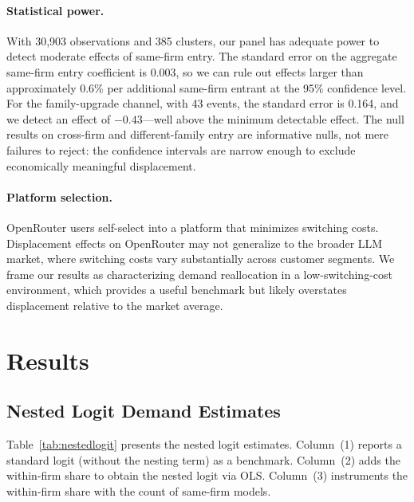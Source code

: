 \documentclass[11pt, a4paper]{article}
\begin{document}
\paragraph{Statistical power.} With 30,903 observations and 385 clusters, our panel has adequate power to detect moderate effects of same-firm entry. The standard error on the aggregate same-firm entry coefficient is 0.003, so we can rule out effects larger than approximately 0.6\% per additional same-firm entrant at the 95\% confidence level. For the family-upgrade channel, with 43 events, the standard error is 0.164, and we detect an effect of $-0.43$---well above the minimum detectable effect. The null results on cross-firm and different-family entry are informative nulls, not mere failures to reject: the confidence intervals are narrow enough to exclude economically meaningful displacement.

\paragraph{Platform selection.} OpenRouter users self-select into a platform that minimizes switching costs. Displacement effects on OpenRouter may not generalize to the broader LLM market, where switching costs vary substantially across customer segments. We frame our results as characterizing demand reallocation in a low-switching-cost environment, which provides a useful benchmark but likely overstates displacement relative to the market average.

\section{Results}
\label{sec:results}

\subsection{Nested Logit Demand Estimates}

Table~\ref{tab:nestedlogit} presents the nested logit estimates. Column~(1) reports a standard logit (without the nesting term) as a benchmark. Column~(2) adds the within-firm share to obtain the nested logit via OLS. Column~(3) instruments the within-firm share with the count of same-firm models.
\end{document}
